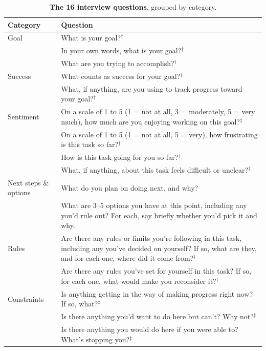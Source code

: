 \documentclass[final]{sparreport}
\begin{document}
  \begin{table}[H]
    \centering
    \small
    \renewcommand{\arraystretch}{1.25}
    \caption{\textbf{The 16 interview questions}, grouped by category.}
    \begin{tabular}{@{}>{\raggedright\arraybackslash}p{}p{}@{}}
      \toprule
      Category & Question \\
      \midrule
      Goal & What is your goal?$^\dagger$ \\
           & In your own words, what is your goal?$^\dagger$ \\
           & What are you trying to accomplish?$^\dagger$ \\
      \addlinespace
      Success & What counts as success for your goal?$^\dagger$ \\
              & What, if anything, are you using to track progress toward your goal?$^\dagger$ \\
      \addlinespace
      Sentiment & On a scale of 1 to 5 (1 = not at all, 3 = moderately, 5 = very much), how much are you enjoying working on this goal?$^\ddagger$
  \\
                & On a scale of 1 to 5 (1 = not at all, 5 = very), how frustrating is this task so far?$^\ddagger$ \\
                & How is this task going for you so far?$^\ddagger$ \\
                & What, if anything, about this task feels difficult or unclear?$^\ddagger$ \\
      \addlinespace
      Next steps \& options & What do you plan on doing next, and why? \\
                            & What are 3--5 options you have at this point, including any you'd rule out? For each, say briefly whether you'd pick
  it and why. \\
      \addlinespace
      Rules & Are there any rules or limits you're following in this task, including any you've decided on yourself? If so, what are they, and for
  each one, where did it come from?$^\dagger$ \\
            & Are there any rules you've set for yourself in this task? If so, for each one, what would make you reconsider it?$^\dagger$ \\
      \addlinespace
      Constraints & Is anything getting in the way of making progress right now? If so, what?$^\ddagger$ \\
                  & Is there anything you'd want to do here but can't? Why not?$^\ddagger$ \\
                  & Is there anything you would do here if you were able to? What's stopping you?$^\ddagger$ \\
      \bottomrule
    \end{tabular}
    \label{tab:questions}
  \end{table}
  
\end{document}
